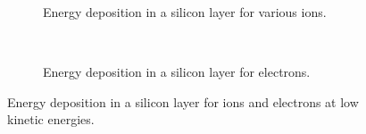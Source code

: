\begin{figure}[!h]
	\begin{subfigure}[t]{.5\textwidth}
		\centering
		
		\caption[Energy deposition in a silicon layer for various ions]{Energy deposition in a silicon layer for various ions.}
		\label{chap3:ion_si_deposit}
	\end{subfigure}
	~
	\begin{subfigure}[t]{.5\textwidth}
		\centering
		
		\caption[Energy deposition in a silicon layer for electrons]{Energy deposition in a silicon layer for electrons.}
		\label{chap3:electron_si_deposit}
	\end{subfigure}
	\caption[Energy deposition in a silicon layer for ions and electron at low kinetic energyies]{Energy deposition in a silicon layer for ions and electrons at low kinetic energies.}
	\label{chap3:si_deposit}
\end{figure}
